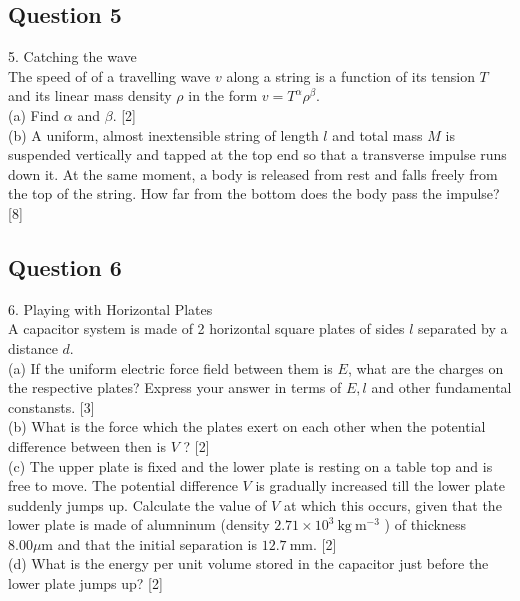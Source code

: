 \documentclass{article}
\begin{document}
\subsection{Question 5}
5. Catching the wave \\
The speed of of a travelling wave $v$ along a string is a function of its tension $T$ and its linear mass density $\rho$ in the form $v=T^{\alpha} \rho^{\beta}$. \\
(a) Find $\alpha$ and $\beta$. [2] \\
(b) A uniform, almost inextensible string of length $l$ and total mass $M$ is suspended vertically and tapped at the top end so that a transverse impulse runs down it. At the same moment, a body is released from rest and falls freely from the top of the string. How far from the bottom does the body pass the impulse? [8]

\subsection{Question 6}
6. Playing with Horizontal Plates \\ A capacitor system is made of 2 horizontal square plates of sides $l$ separated by a distance $d$. \\
(a) If the uniform electric force field between them is $E$, what are the charges on the respective plates? Express your answer in terms of $E, l$ and other fundamental constansts.  [3] \\
(b) What is the force which the plates exert on each other when the potential difference between then is $V$ ? [2] \\
(c) The upper plate is fixed and the lower plate is resting on a table top and is free to move. The potential difference $V$ is gradually increased till the lower plate suddenly jumps up. Calculate the value of $V$ at which this occurs, given that the lower plate is made of alumninum (density $2.71 \times 10^{3} \mathrm{~kg} \mathrm{~m}^{-3}$ ) of thickness $8.00 \mu \mathrm{m}$ and that the initial separation is $12.7 \mathrm{~mm}$. [2] \\
(d) What is the energy per unit volume stored in the capacitor just before the lower plate jumps up? [2] 
\end{document}
